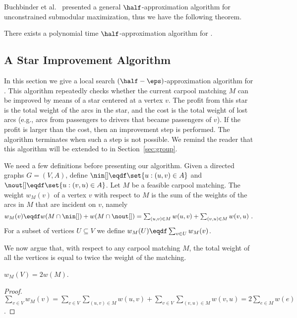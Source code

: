 Buchbinder et al.~\cite{BFNS15,buchbinder2016deterministic} presented
a general $\half$-approximation algorithm for unconstrained
submodular maximization, thus we have the following theorem.

\begin{theorem}
There exists a polynomial time $\half$-approximation algorithm
for \carpool.
\end{theorem}


\subsection{A Star Improvement Algorithm}
\label{sec:improve}

In this section we give a local search $(\half-\eps)$-approximation
algorithm for \carpool.  This algorithm repeatedly checks whether the
current carpool matching $M$ can be improved by means of a star
centered at a vertex $v$.  The profit from this star is the total
weight of the arcs in the star, and the cost is the total weight of
lost arcs (e.g., arcs from passengers to drivers that became
passengers of $v$).  If the profit is larger than the cost, then an
improvement step is performed.  The algorithm terminates when such a
step is not possible.
%
We remind the reader that this algorithm will be extended to \gcp in
Section~\ref{sec:group}.

We need a few definitions before presenting our algorithm.
%
Given a directed graphs $G = (V,A)$, define $\nin[] \eqdf \set{u :
(u,v) \in A}$ and $\nout[] \eqdf \set{u : (v,u) \in A}$.
%
Let $M$ be a feasible carpool matching.  The weight $w_M(v)$ of a
vertex $v$ with respect to $M$ is the sum of the weights of the arcs
in $M$ that are incident on $v$, namely
\[
\textstyle
w_M(v)
\eqdf w(M \cap \nin[]) + w(M \cap \nout[])
=     \sum_{(u, v) \in M} w(u, v) + \sum_{(v, u) \in M} w(v, u)
~.
\]
For a subset of vertices $U \subseteq V$ we define
$w_M(U) \eqdf \sum_{v \in U} w_M(v)$.

We now argue that, with respect to any carpool matching $M$, the total
weight of all the vertices is equal to twice the weight of the matching.

\begin{observation}
\label{lm:val-twice}
$w_M(V) = 2 w(M)$.
\end{observation}
\begin{proof}
\(
\displaystyle
\sum_{v \in V} w_M(v)
= \sum_{v \in V} \sum_{(u, v) \in M} w(u, v) +
    \sum_{v \in V} \sum_{(v, u) \in M} w(v, u) 
= 2 \sum_{e \in M} w(e)
\).
\end{proof}


